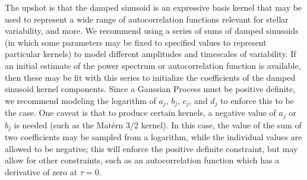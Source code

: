 \documentclass[manuscript, letterpaper]{aastex6}
\begin{document}
The upshot is that the damped sinusoid is an expressive basis kernel that may be used
to represent a wide range of autocorrelation functions relevant for stellar variability, and
more.
We recommend using a series of sums of damped sinusoids (in which some parameters may be
fixed to specified values to represent particular kernels) to model different amplitudes
and timescales of variability.  If an initial estimate of the power spectrum or
autocorrelation function is available, then these may be fit with this series to
initialize the coefficients of the damped sinusoid kernel components.
Since a Gaussian Process
must be positive definite, we recommend modeling the logarithm of $a_j$, $b_j$,
$c_j$, and $d_j$ to enforce this to be the case.  One caveat is
that to produce certain kernels, a negative value of $a_j$ or $b_j$ is needed (such
as the Mat\'ern 3/2 kernel).  In this case, the value of the sum of
two coefficients may be sampled from a logarithm, while the individual
values are allowed to be negative;  this will enforce the positive definite
constraint, but may allow for other constraints, such as an autocorrelation
function which has a derivative of zero at $\tau = 0$.
\end{document}
